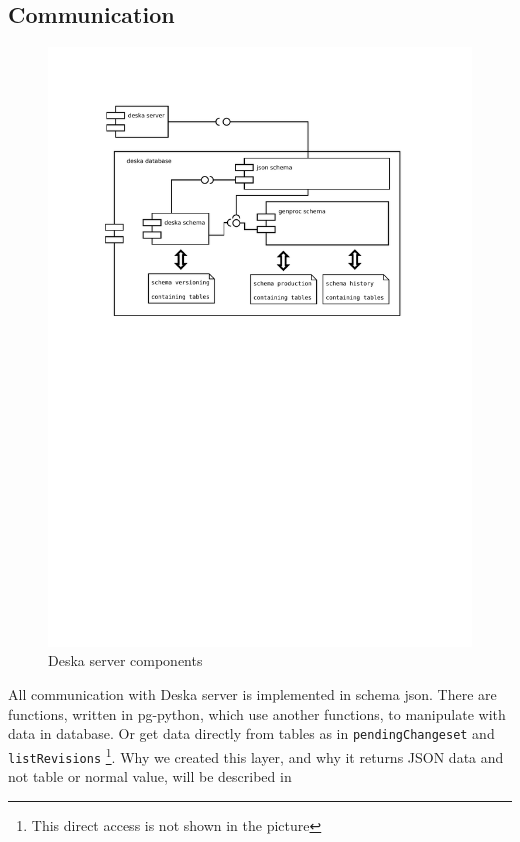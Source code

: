 \documentclass[deska]{subfiles}
\begin{document}
\subsection{Communication}
\begin{figure}[h]
	\centering
	\label{img:deska-server}
	\includegraphics[trim=28mm 170mm 30mm 28mm]{img-deska-server-components.pdf}
	\caption{Deska server components}
\end{figure}

All communication with Deska server is implemented in schema json. There are functions, written in pg-python, which use another
functions, to manipulate with data in database. Or get data directly from tables as in {\tt pendingChangeset} and {\tt listRevisions}
\footnote{This direct access is not shown in the picture}.
Why we created this layer, and why it returns JSON data and not table or normal value, will be described in 
\end{document}
